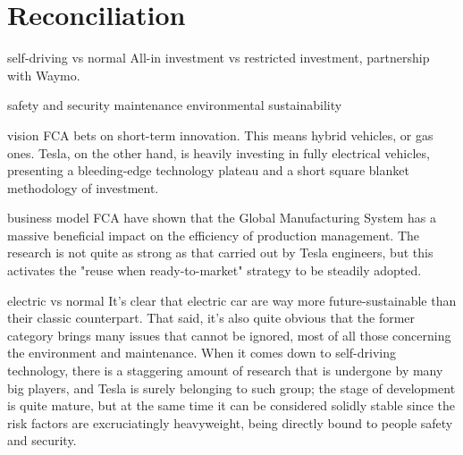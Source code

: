 \section{Reconciliation}


self-driving vs normal
    All-in investment vs restricted investment, partnership with Waymo.

safety and security
maintenance
environmental sustainability


vision
    FCA bets on short-term innovation. This means hybrid vehicles, or gas ones. Tesla, on the other hand, is heavily investing in fully electrical vehicles, presenting a bleeding-edge technology plateau and a short square blanket methodology of investment.
    
business model
    FCA have shown that the Global Manufacturing System has a massive beneficial impact on the efficiency of production management. The research is not quite as strong as that carried out by Tesla engineers, but this activates the "reuse when ready-to-market" strategy to be steadily adopted.
    
electric vs normal
    It's clear that electric car are way more future-sustainable than their classic counterpart. That said, it's also quite obvious that the former category brings many issues that cannot be ignored, most of all those concerning the environment and maintenance. When it comes down to self-driving technology, there is a staggering amount of research that is undergone by many big players, and Tesla is surely belonging to such group; the stage of development is quite mature, but at the same time it can be considered solidly stable since the risk factors are excruciatingly heavyweight, being directly bound to people safety and security.
    
